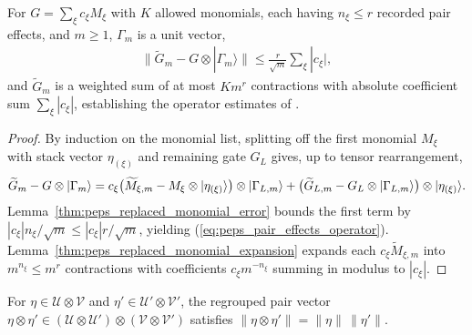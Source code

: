 \begin{lemma}
    \label{thm:peps_pair_effects_operator}
    \leanok
    For $G=\sum_\xi c_\xi M_\xi$ with $K$ allowed monomials, each having
    $n_\xi\le r$ recorded pair effects, and $m\ge1$, $\Gamma_m$ is a unit vector,
    \begin{align}
        \bigl\|\widetilde G_m-G\otimes|\Gamma_m\rangle\bigr\|
        \le\frac r{\sqrt m}\sum_\xi|c_\xi|,
        \label{eq:peps_pair_effects_operator}
    \end{align}
    and $\widetilde G_m$ is a weighted sum of at most $Km^r$ contractions with
    absolute coefficient sum $\sum_\xi|c_\xi|$, establishing the operator
    estimates of \cite[Lemma~5.1]{OpenAI2026PolynomialPEPS}.
\end{lemma}

\begin{proof}\leanok
    By induction on the monomial list, splitting off the first monomial $M_\xi$
    with stack vector $\eta_{(\xi)}$ and remaining gate $G_L$ gives, up to
    tensor rearrangement,
    \begin{align}
        \widetilde G_m-G\otimes|\Gamma_m\rangle
        =c_\xi\bigl(\widetilde M_{\xi,m}-M_\xi\otimes|\eta_{(\xi)}\rangle\bigr)
        \otimes|\Gamma_{L,m}\rangle
        +\bigl(\widetilde G_{L,m}-G_L\otimes|\Gamma_{L,m}\rangle\bigr)
        \otimes|\eta_{(\xi)}\rangle.\notag
    \end{align}
    Lemma~\ref{thm:peps_replaced_monomial_error} bounds the first term by
    $|c_\xi|n_\xi/\sqrt m\le|c_\xi|r/\sqrt m$, yielding (\ref{eq:peps_pair_effects_operator}).
    Lemma~\ref{thm:peps_replaced_monomial_expansion} expands each
    $c_\xi\widetilde M_{\xi,m}$ into $m^{n_\xi}\le m^r$ contractions with
    coefficients $c_\xi m^{-n_\xi}$ summing in modulus to $|c_\xi|$.
\end{proof}

\begin{lemma}
    \label{thm:peps_pair_combine}
    \leanok
    For $\eta\in\mathcal U\otimes\mathcal V$ and
    $\eta'\in\mathcal U'\otimes\mathcal V'$, the regrouped pair vector
    $\eta\otimes\eta'\in(\mathcal U\otimes\mathcal U')\otimes(\mathcal V\otimes\mathcal V')$
    satisfies $\|\eta\otimes\eta'\|=\|\eta\|\,\|\eta'\|$.
\end{lemma}

